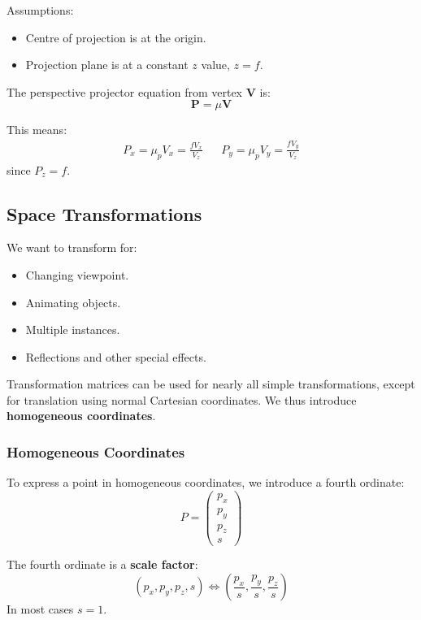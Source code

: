 \documentclass[11pt]{article}
\begin{document}
Assumptions:
\begin{itemize}
  \item Centre of projection is at the origin.
  \item Projection plane is at a constant $z$ value, $z = f$.
\end{itemize}

The perspective projector equation from vertex $\bm{V}$ is:
\[ \bm{P} = \mu \bm{V} \]

This means:
\begin{align*}
  P_x = \mu_p V_x = \frac{fV_x}{V_z} && P_y = \mu_p V_y = \frac{fV_y}{V_z}
\end{align*}
since $P_z = f$.

\subsection{Space Transformations}
We want to transform for:
\begin{itemize}
  \item Changing viewpoint.
  \item Animating objects.
  \item Multiple instances.
  \item Reflections and other special effects.
\end{itemize}

Transformation matrices can be used for nearly all simple transformations, except for translation using normal Cartesian coordinates.
We thus introduce \textbf{homogeneous coordinates}.

\subsubsection{Homogeneous Coordinates}
To express a point in homogeneous coordinates, we introduce a fourth ordinate:
\[ P = \begin{pmatrix} p_x \\ p_y \\ p_z \\ s \end{pmatrix} \]

The fourth ordinate is a \textbf{scale factor}:
\[ (p_x, p_y, p_z, s) \Leftrightarrow (\frac{p_x}{s}, \frac{p_y}{s}, \frac{p_z}{s}) \]
In most cases $s = 1$.
\end{document}
